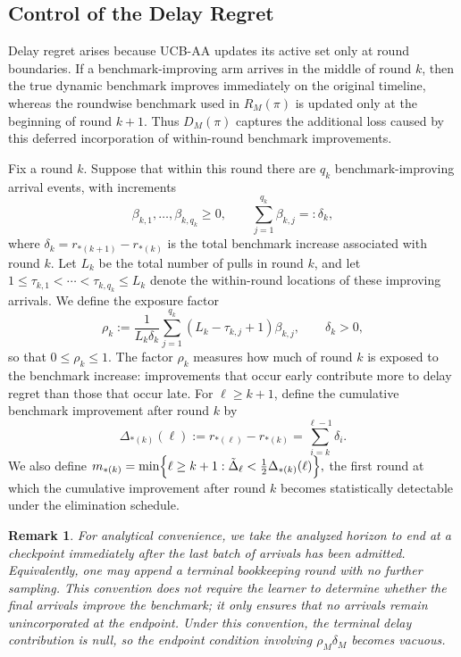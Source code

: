 \documentclass[
  12pt]{article}
\newtheorem{note}{Remark}
\begin{document}
\subsection{Control of the Delay Regret}

Delay regret arises because UCB-AA updates its active set only at round boundaries. If a
benchmark-improving arm arrives in the middle of round \(k\), then the true dynamic
benchmark improves immediately on the original timeline, whereas the roundwise benchmark
used in \(R_M(\pi)\) is updated only at the beginning of round \(k+1\). Thus \(D_M(\pi)\)
captures the additional loss caused by this deferred incorporation of within-round benchmark
improvements.

Fix a round \(k\). Suppose that within this round there are \(q_k\) benchmark-improving
arrival events, with increments
\[
\beta_{k,1},\dots,\beta_{k,q_k}\ge 0,
\qquad 
\sum_{j=1}^{q_k}\beta_{k,j}=: \delta_k,
\]
where
\(
\delta_k=r_{*(k+1)}-r_{*(k)}
\)
is the total benchmark increase associated with round \(k\). Let \(L_k\) be the total number
of pulls in round \(k\), and let
\(
1\le \tau_{k,1}<\cdots<\tau_{k,q_k}\le L_k
\)
denote the within-round locations of these improving arrivals. We define the exposure factor
\[
\rho_k:=
\frac{1}{L_k\delta_k}
\sum_{j=1}^{q_k}(L_k-\tau_{k,j}+1)\beta_{k,j},
\qquad \delta_k>0,
\]
so that \(0\le \rho_k\le 1\). The factor \(\rho_k\) measures how much of round \(k\) is exposed
to the benchmark increase: improvements that occur early contribute more to delay regret than
those that occur late.
For \(\ell\ge k+1\), define the cumulative benchmark improvement after round \(k\) by
\[
\Delta_{*(k)}(\ell):=r_{*(\ell)}-r_{*(k)}=\sum_{i=k}^{\ell-1}\delta_i.
\]
We also define
\(
m_{*(k)}=\min\Bigl\{\ell\ge k+1:\tilde\Delta_\ell<\tfrac12\Delta_{*(k)}(\ell)\Bigr\},
\)
the first round at which the cumulative improvement after round \(k\) becomes statistically
detectable under the elimination schedule.

\begin{note}
For analytical convenience, we take the analyzed horizon to end at a checkpoint immediately
after the last batch of arrivals has been admitted. Equivalently, one may append a terminal
bookkeeping round with no further sampling. This convention does not require the learner to
determine whether the final arrivals improve the benchmark; it only ensures that no arrivals
remain unincorporated at the endpoint. Under this convention, the terminal delay contribution
is null, so the endpoint condition involving \(\rho_M\delta_M\) becomes vacuous.
\end{note}
\end{document}
